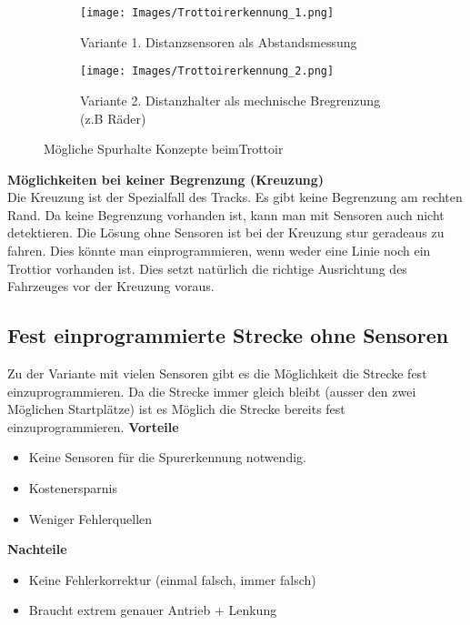 \begin{figure} [hbp]
	\centering
	\begin{subfigure}[b]{0.4\textwidth}
		\texttt{[image: Images/Trottoirerkennung\_1.png]}
		\caption{Variante 1. Distanzsensoren als Abstandsmessung}
	\end{subfigure}
	\hfill
	\begin{subfigure}[b]{0.4\textwidth}
		\texttt{[image: Images/Trottoirerkennung\_2.png]}
		\caption{Variante 2. Distanzhalter als mechnische Bregrenzung (z.B Räder)}
\end{subfigure}
	\caption{Mögliche Spurhalte Konzepte beimTrottoir}\label{fig:animals}
\end{figure}

\textbf {Möglichkeiten bei keiner Begrenzung (Kreuzung)} \\
Die Kreuzung ist der Spezialfall des Tracks. Es gibt keine Begrenzung am rechten Rand. 
Da keine Begrenzung vorhanden ist, kann man mit Sensoren auch nicht detektieren.
Die Lösung ohne Sensoren ist bei der Kreuzung stur geradeaus zu fahren. Dies könnte man einprogrammieren, wenn weder eine Linie noch ein Trottior vorhanden ist. Dies setzt natürlich die richtige Ausrichtung des Fahrzeuges vor der Kreuzung voraus.\\

\subsection{Fest einprogrammierte Strecke ohne Sensoren}
Zu der Variante mit vielen Sensoren gibt es die Möglichkeit die Strecke fest einzuprogrammieren. Da die Strecke immer gleich bleibt (ausser den zwei Möglichen Startplätze) ist es Möglich die Strecke bereits fest einzuprogrammieren.
\textbf {Vorteile}
\begin{itemize}
\item Keine Sensoren für die Spurerkennung notwendig.
\item Kostenersparnis
\item Weniger Fehlerquellen\\
\end{itemize}
\textbf {Nachteile}
\begin{itemize}
\item Keine Fehlerkorrektur (einmal falsch, immer falsch)
\item Braucht extrem genauer Antrieb + Lenkung
\end{itemize}